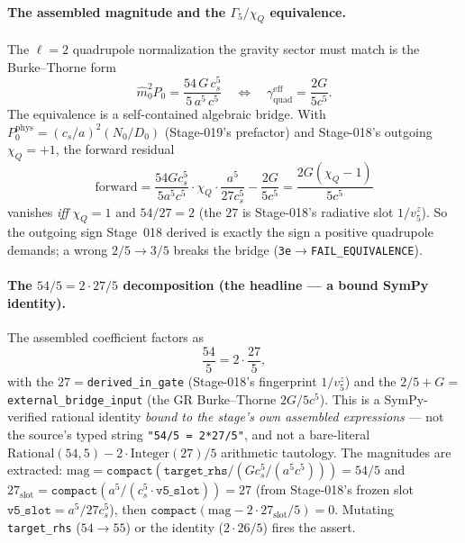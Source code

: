 \paragraph{The assembled magnitude and the \texorpdfstring{\(\Gamma_5/\chi_Q\)}{Gamma5/chiQ} equivalence.}
The \(\ell=2\) quadrupole normalization the gravity sector must match is the Burke--Thorne form
\[
  \hat m_0^2 P_0 = \frac{54\,G\,c_s^5}{5\,a^5\,c^5}
  \quad\Longleftrightarrow\quad
  \gamma_{\mathrm{quad}}^{\mathrm{eff}} = \frac{2G}{5c^5}.
\]
The equivalence is a self-contained algebraic bridge. With \(P_0^{\mathrm{phys}}=(c_s/a)^2(N_0/D_0)\)
(Stage-019's prefactor) and Stage-018's outgoing \(\chi_Q=+1\), the forward residual
\[
  \mathrm{forward}
  = \frac{54Gc_s^5}{5a^5c^5}\cdot\chi_Q\cdot\frac{a^5}{27c_s^5} - \frac{2G}{5c^5}
  = \frac{2G(\chi_Q-1)}{5c^5}
\]
vanishes \emph{iff} \(\chi_Q=1\) and \(54/27=2\) (the \(27\) is Stage-018's radiative slot
\(1/v_5^z\)). So the outgoing sign Stage~018 derived is exactly the sign a positive quadrupole
demands; a wrong \(2/5\to3/5\) breaks the bridge (\texttt{3e}\(\to\)\texttt{FAIL\_EQUIVALENCE}).

\paragraph{The \texorpdfstring{\(54/5=2\cdot27/5\)}{54/5=2*27/5} decomposition (the headline --- a bound SymPy identity).}
The assembled coefficient factors as
\[
  \frac{54}{5} = 2\cdot\frac{27}{5},
\]
with the \(27=\)\texttt{derived\_in\_gate} (Stage-018's fingerprint \(1/v_5^z\)) and the \(2/5+G=\)
\texttt{external\_bridge\_input} (the GR Burke--Thorne \(2G/5c^5\)). This is a SymPy-verified
rational identity \emph{bound to the stage's own assembled expressions} --- not the source's typed
string \texttt{"54/5 = 2*27/5"}, and not a bare-literal \(\mathrm{Rational}(54,5)-2\cdot\mathrm{Integer}(27)/5\)
arithmetic tautology. The magnitudes are extracted:
\(\mathrm{mag}=\texttt{compact}(\texttt{target\_rhs}/(Gc_s^5/(a^5c^5)))=54/5\) and
\(27_{\mathrm{slot}}=\texttt{compact}(a^5/(c_s^5\cdot\texttt{v5\_slot}))=27\) (from Stage-018's frozen
slot \(\texttt{v5\_slot}=a^5/27c_s^5\)), then \(\texttt{compact}(\mathrm{mag}-2\cdot27_{\mathrm{slot}}/5)=0\).
Mutating \texttt{target\_rhs} (\(54\to55\)) or the identity (\(2\cdot26/5\)) fires the assert.

